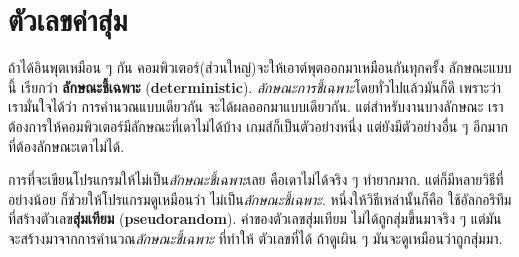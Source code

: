 \section{ตัวเลขค่าสุ่ม}



ถ้าได้อินพุตเหมือน ๆ กัน
คอมพิวเตอร์(ส่วนใหญ่)จะให้เอาต์พุตออกมาเหมือนกันทุกครั้ง
ลักษณะแบบนี้ เรียกว่า \textbf{ลักษณะชี้เฉพาะ} (\textbf{deterministic}).
\textit{ลักษณะการชี้เฉพาะ}โดยทั่วไปแล้วมันก็ดี
เพราะว่า เรามั่นใจได้ว่า การคำนวณแบบเดียวกัน จะได้ผลออกมาแบบเดียวกัน.
แต่สำหรับงานบางลักษณะ
เราต้องการให้คอมพิวเตอร์มีลักษณะที่เดาไม่ได้บ้าง
เกมส์ก็เป็นตัวอย่างหนึ่ง แต่ยังมีตัวอย่างอื่น ๆ อีกมาก ที่ต้องลักษณะเดาไม่ได้.


การที่จะเขียนโปรแกรมให้ไม่เป็น\textit{ลักษณะชี้เฉพาะ}เลย คือเดาไม่ได้จริง ๆ ทำยากมาก.
แต่ก็มีหลายวิธีที่ อย่างน้อย ก็ช่วยให้โปรแกรมดูเหมือนว่า ไม่เป็น\textit{ลักษณะชี้เฉพาะ}.
หนึ่งให้วิธีเหล่านั้นก็คือ ใช้อัลกอริทึมที่สร้างตัวเลข\textbf{สุ่มเทียม} (\textbf{pseudorandom}).
ค่าของตัวเลขสุ่มเทียม ไม่ได้ถูกสุ่มขึ้นมาจริง ๆ
แต่มันจะสร้างมาจากการคำนวณ\textit{ลักษณะชี้เฉพาะ}
ที่ทำให้ ตัวเลขที่ได้ ถ้าดูเผิน ๆ มันจะดูเหมือนว่าถูกสุ่มมา.



